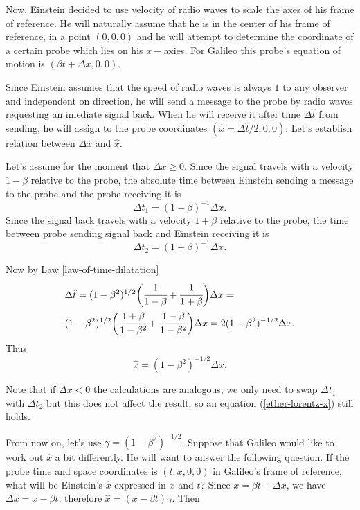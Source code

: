 \documentclass[main.tex]{subfiles}
\begin{document}
Now, Einstein decided to use velocity of radio waves to scale the axes of his frame of reference. He will naturally assume that he is in the center of his frame of reference, in a point $(0, 0, 0)$ and he will attempt to determine the coordinate of a certain probe which lies on his $x-$axies. For Galileo this probe's equation of motion is $(\beta t + \Delta x, 0, 0)$.

Since Einstein assumes that the speed of radio waves is always $1$ to any observer and independent on direction, he will send a message to the probe by radio waves requesting an imediate signal back. When he will receive it after time $\Delta \hat{t}$ from sending, he will assign to the probe coordinates $(\hat{x} = \Delta \hat{t}/2, 0, 0)$. Let's establish relation between $\Delta x$ and $\hat{x}$.

Let's assume for the moment that $\Delta x \geq 0$. Since the signal travels with a velocity $1 - \beta$ relative to the probe, the absolute time between Einstein sending a message to the probe and the probe receiving it is
\begin{equation}
\Delta t_1 = (1 - \beta)^{-1} \Delta x.
\end{equation}
Since the signal back travels with a velocity $1 + \beta$ relative to the probe, the time between probe sending signal back and Einstein receiving it is
\begin{equation}
\Delta t_2 = (1 + \beta)^{-1} \Delta x.
\end{equation}

Now by Law \ref{law-of-time-dilatation}
\begin{align*}
& \Delta \hat{t} = (1 - \beta^2)^{1/2}\bigg(\cfrac{1}{1 - \beta} + \cfrac{1}{1 + \beta} \bigg) \Delta x = \\
& (1 - \beta^2)^{1/2} \bigg(\cfrac{1 + \beta}{1 - \beta^2} + \cfrac{1 - \beta}{1 - \beta^2} \bigg) \Delta x = 2(1-\beta^2)^{-1/2} \Delta x.
\end{align*}
Thus
\begin{equation}
\label{ether-lorentz-x}
\hat{x} = (1-\beta^2)^{-1/2} \Delta x.
\end{equation}

Note that if $\Delta x < 0$ the calculations are analogous, we only need to swap $\Delta t_1$ with $\Delta t_2$ but this does not affect the result, so an equation (\ref{ether-lorentz-x}) still holds.

From now on, let's use $\gamma = (1-\beta^2)^{-1/2}$. Suppose that Galileo would like to work out $\hat{x}$ a bit differently. He will want to answer the following question. If the probe time and space coordinates is $(t, x, 0, 0)$ in Galileo's frame of reference, what will be Einstein's $\hat{x}$ expressed in $x$ and $t$? Since $x = \beta t + \Delta x$, we have $\Delta x = x - \beta t$, therefore $\hat{x} = (x - \beta t) \gamma$. Then
\end{document}
